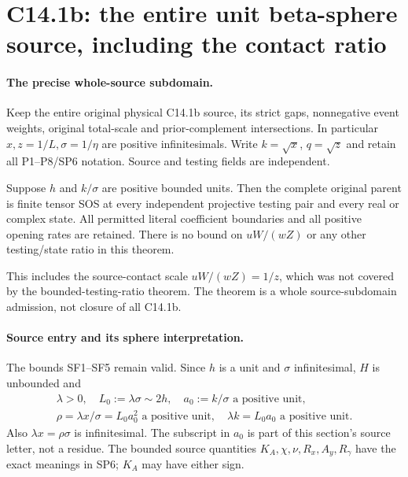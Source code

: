 \section{\texorpdfstring{C14.1b: the entire unit beta-sphere source, including the contact ratio}{C14.1b: the entire unit beta-sphere source, including the contact ratio}}
\label{component:p0931b3af19ec}

\label{p0931b3af19ec:sec:c141b-unit-beta-sphere}

\paragraph{The precise whole-source subdomain.}
Keep the entire original physical C14.1b source, its strict gaps,
nonnegative event weights, original total-scale and prior-complement
intersections. In particular $x,z=1/L,\sigma=1/\eta$ are positive
infinitesimals. Write $k=\sqrt x$, $q=\sqrt z$ and retain all
P1--P8/SP6 notation. Source and testing fields are independent.

\begin{theorem}
Suppose $h$ and $k/\sigma$ are positive bounded units. Then the
complete original parent is finite tensor SOS at every independent
projective testing pair and every real or complex state. All permitted
literal coefficient boundaries and all positive opening rates are
retained. There is no bound on $uW/(wZ)$ or any other testing/state
ratio in this theorem.
\end{theorem}

This includes the source-contact scale $uW/(wZ)=1/z$, which was not
covered by the bounded-testing-ratio theorem. The theorem is a whole
source-subdomain admission, not closure of all C14.1b.

\paragraph{Source entry and its sphere interpretation.}
The bounds SF1--SF5 remain valid. Since $h$ is a unit and
$\sigma$ infinitesimal, $H$ is unbounded and
\[
 \begin{gathered}
 \lambda>0,\quad L_0:=\lambda\sigma\sim2h,\quad
 a_0:=k/\sigma\text{ a positive unit},\\
 \rho=\lambda x/\sigma=L_0a_0^2\text{ a positive unit},
 \quad \lambda k=L_0a_0\text{ a positive unit}.
 \end{gathered}
 \tag{US1}
\]
Also $\lambda x=\rho\sigma$ is infinitesimal. The subscript in
$a_0$ is part of this section's source letter, not a residue.
The bounded source quantities $K_A,\chi,\nu,R_x,A_y,R_\gamma$
have the exact meanings in SP6; $K_A$ may have either sign.


